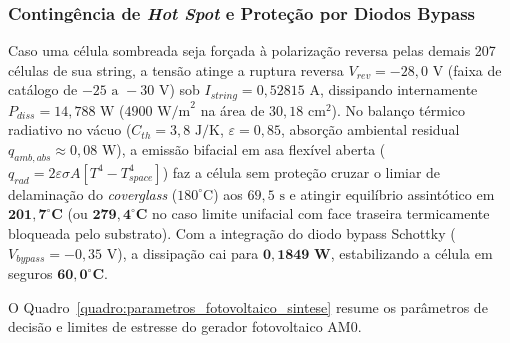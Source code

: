\subsubsection{Contingência de \textit{Hot Spot} e Proteção por Diodos Bypass}

Caso uma célula sombreada seja forçada à polarização reversa pelas demais 207 células de sua string, a tensão atinge a ruptura reversa $V_{rev}=-28{,}0\text{ V}$ (faixa de catálogo de $-25\text{ a }-30\text{ V}$) sob $I_{string}=0{,}52815\text{ A}$, dissipando internamente $P_{diss}=14{,}788\text{ W}$ ($4900\text{ W/m}^2$ na área de $30{,}18\text{ cm}^2$). No balanço térmico radiativo no vácuo ($C_{th} = 3{,}8\text{ J/K}$, $\varepsilon = 0{,}85$, absorção ambiental residual $q_{amb,abs} \approx 0{,}08\text{ W}$), a emissão bifacial em asa flexível aberta ($q_{rad} = 2 \varepsilon \sigma A [T^4 - T_{space}^4]$) faz a célula sem proteção cruzar o limiar de delaminação do \textit{coverglass} ($180^\circ\text{C}$) aos $69{,}5\text{ s}$ e atingir equilíbrio assintótico em $\mathbf{201{,}7^\circ\text{C}}$ (ou $\mathbf{279{,}4^\circ\text{C}}$ no caso limite unifacial com face traseira termicamente bloqueada pelo substrato). Com a integração do diodo bypass Schottky ($V_{bypass}=-0{,}35\text{ V}$), a dissipação cai para $\mathbf{0{,}1849\text{ W}}$, estabilizando a célula em seguros $\mathbf{60{,}0^\circ\text{C}}$.

O Quadro~\ref{quadro:parametros_fotovoltaico_sintese} resume os parâmetros de decisão e limites de estresse do gerador fotovoltaico AM0.

